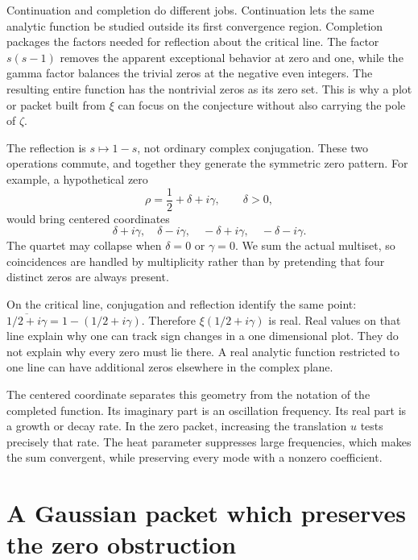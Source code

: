 Continuation and completion do different jobs. Continuation lets the same analytic function be studied outside its first convergence region. Completion packages the factors needed for reflection about the critical line. The factor \(s(s-1)\) removes the apparent exceptional behavior at zero and one, while the gamma factor balances the trivial zeros at the negative even integers. The resulting entire function has the nontrivial zeros as its zero set. This is why a plot or packet built from \(\xi\) can focus on the conjecture without also carrying the pole of \(\zeta\).

The reflection is \(s\mapsto1-s\), not ordinary complex conjugation. These two operations commute, and together they generate the symmetric zero pattern. For example, a hypothetical zero
\[
\rho=\frac12+\delta+i\gamma,\qquad \delta>0,
\]
would bring centered coordinates
\[
\delta+i\gamma,\quad \delta-i\gamma,\quad
-\delta+i\gamma,\quad-\delta-i\gamma.
\]
The quartet may collapse when \(\delta=0\) or \(\gamma=0\). We sum the actual multiset, so coincidences are handled by multiplicity rather than by pretending that four distinct zeros are always present.

On the critical line, conjugation and reflection identify the same point:
\(\overline{1/2+i\gamma}=1-(1/2+i\gamma)\). Therefore \(\xi(1/2+i\gamma)\) is real. Real values on that line explain why one can track sign changes in a one dimensional plot. They do not explain why every zero must lie there. A real analytic function restricted to one line can have additional zeros elsewhere in the complex plane.

The centered coordinate separates this geometry from the notation of the completed function. Its imaginary part is an oscillation frequency. Its real part is a growth or decay rate. In the zero packet, increasing the translation \(u\) tests precisely that rate. The heat parameter suppresses large frequencies, which makes the sum convergent, while preserving every mode with a nonzero coefficient.


\section{A Gaussian packet which preserves the zero obstruction}

